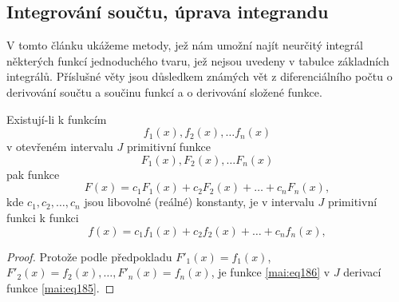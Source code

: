    \subsection{Integrování součtu, úprava integrandu}\label{mai:IchapVIIsecIIIssecI}  
      V tomto článku ukážeme metody, jež nám umožní najít neurčitý integrál některých funkcí
      jednoduchého tvaru, jež nejsou uvedeny v tabulce základních integrálů. Příslušné věty jsou
      důsledkem známých vět z diferenciálního počtu o derivování součtu a součinu funkcí a o
      derivování složené funkce. 

      \begin{mdframed}[style=mdmathlemma]
        \begin{lemma}\label{mai:lemma012}        
          Existují-li k funkcím
          \begin{equation}\label{mai:eq183}
            f_1(x), f_2(x), \ldots f_n(x) 
          \end{equation}
          v otevřeném intervalu \(J\) primitivní funkce
          \begin{equation}\label{mai:eq184}
            F_1(x), F_2(x), \ldots F_n(x) 
          \end{equation}
          pak funkce 
          \begin{equation}\label{mai:eq185}
            F(x) = c_1F_1(x) + c_2F_2(x) + \ldots + c_nF_n(x),
          \end{equation}
          kde \(c_1, c_2, \ldots, c_n\) jsou libovolné (reálné) konstanty, je v intervalu \(J\)
          primitivní funkci k funkci 
          \begin{equation}\label{mai:eq186}
            f(x) = c_1f_1(x) + c_2f_2(x) + \ldots + c_nf_n(x),
          \end{equation}
        \end{lemma}
        \begin{proof}
          Protože podle předpokladu \(F'_1(x) = f_1(x)\), \(F'_2(x) = f_2(x),\ldots, F'_n(x) =
          f_n(x)\), je funkce \eqref{mai:eq186} v \(J\) derivací funkce \eqref{mai:eq185}.
        \end{proof}
      \end{mdframed}

